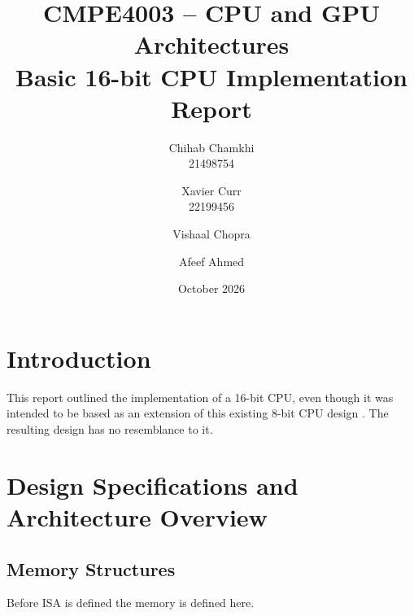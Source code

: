 \documentclass{article}
\title{
\large CMPE4003 -- CPU and GPU Architectures \\
\LARGE Basic 16-bit CPU Implementation Report}
\author{
    Chihab Chamkhi \\
    21498754 \\
    \and
    Xavier Curr \\
    22199456 \\
    \and
    Vishaal Chopra \\
    \and
    Afeef Ahmed
}
\date{October 2026}
\begin{document}
\maketitle

\section{Introduction}
This report outlined the implementation of a 16-bit CPU, even though it was intended to be based as an extension of this existing 8-bit CPU design  \cite{8bitref}. The resulting design has no resemblance to it.

\section{Design Specifications and Architecture Overview}

\subsection{Memory Structures}
Before ISA is defined the memory is defined here.
\end{document}
